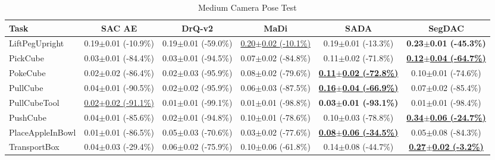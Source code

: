 \begin{table}[htbp]
\centering
\scriptsize
\caption{Medium Camera Pose Test}
\label{tab:appendix_cameraposetest_medium}
\begin{adjustbox}{max width=\textwidth}
\begin{tabular}{l*{5}{c}}
\toprule
\textbf{Task} & \textbf{SAC AE} & \textbf{DrQ-v2} & \textbf{MaDi} & \textbf{SADA} & \textbf{SegDAC} \\
\midrule
LiftPegUpright & 0.19$\pm$0.01 \scriptsize{(-10.9\%)} & 0.19$\pm$0.01 \scriptsize{(-59.0\%)} & \underline{0.20$\pm$0.02 \scriptsize{(-10.1\%)}} & 0.19$\pm$0.01 \scriptsize{(-13.3\%)} & \textbf{0.23$\pm$0.01 \scriptsize{(-45.3\%)}} \\
PickCube & 0.03$\pm$0.01 \scriptsize{(-84.4\%)} & 0.03$\pm$0.01 \scriptsize{(-94.5\%)} & 0.07$\pm$0.02 \scriptsize{(-84.8\%)} & 0.11$\pm$0.02 \scriptsize{(-71.8\%)} & \textbf{\underline{0.12$\pm$0.04 \scriptsize{(-64.7\%)}}} \\
PokeCube & 0.02$\pm$0.02 \scriptsize{(-86.4\%)} & 0.02$\pm$0.03 \scriptsize{(-95.9\%)} & 0.08$\pm$0.02 \scriptsize{(-79.6\%)} & \textbf{\underline{0.11$\pm$0.02 \scriptsize{(-72.8\%)}}} & 0.10$\pm$0.01 \scriptsize{(-74.6\%)} \\
PullCube & 0.04$\pm$0.01 \scriptsize{(-90.5\%)} & 0.02$\pm$0.02 \scriptsize{(-95.9\%)} & 0.06$\pm$0.03 \scriptsize{(-87.5\%)} & \textbf{\underline{0.16$\pm$0.04 \scriptsize{(-66.9\%)}}} & 0.07$\pm$0.02 \scriptsize{(-85.4\%)} \\
PullCubeTool & \underline{0.02$\pm$0.02 \scriptsize{(-91.1\%)}} & 0.01$\pm$0.01 \scriptsize{(-99.1\%)} & 0.01$\pm$0.01 \scriptsize{(-98.8\%)} & \textbf{0.03$\pm$0.01 \scriptsize{(-93.1\%)}} & 0.01$\pm$0.01 \scriptsize{(-98.4\%)} \\
PushCube & 0.04$\pm$0.01 \scriptsize{(-85.6\%)} & 0.02$\pm$0.01 \scriptsize{(-94.8\%)} & 0.10$\pm$0.01 \scriptsize{(-78.6\%)} & 0.10$\pm$0.03 \scriptsize{(-78.8\%)} & \textbf{\underline{0.34$\pm$0.06 \scriptsize{(-24.7\%)}}} \\
PlaceAppleInBowl & 0.01$\pm$0.01 \scriptsize{(-86.5\%)} & 0.05$\pm$0.03 \scriptsize{(-70.6\%)} & 0.03$\pm$0.02 \scriptsize{(-77.6\%)} & \textbf{\underline{0.08$\pm$0.06 \scriptsize{(-34.5\%)}}} & 0.05$\pm$0.08 \scriptsize{(-84.3\%)} \\
TransportBox & 0.04$\pm$0.03 \scriptsize{(-29.4\%)} & 0.06$\pm$0.02 \scriptsize{(-75.9\%)} & 0.10$\pm$0.06 \scriptsize{(-61.8\%)} & 0.14$\pm$0.08 \scriptsize{(-44.7\%)} & \textbf{\underline{0.27$\pm$0.02 \scriptsize{(-3.2\%)}}} \\
\bottomrule
\end{tabular}
\end{adjustbox}
\end{table}

